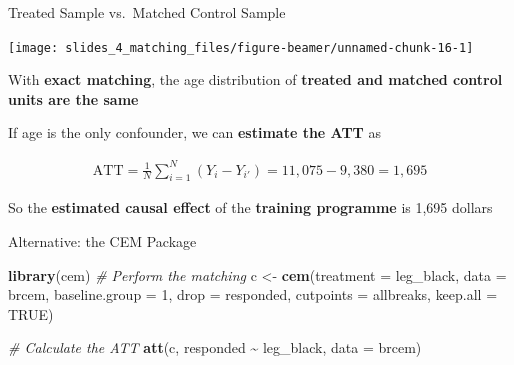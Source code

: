 \documentclass[
  ignorenonframetext,
  aspectratio=169, handout]{beamer}
\newenvironment{Shaded}{\begin{snugshade}}{\end{snugshade}}
\newcommand{\AttributeTok}[1]{\textcolor[rgb]{0.13,0.29,0.53}{#1}}
\newcommand{\CommentTok}[1]{\textcolor[rgb]{0.56,0.35,0.01}{\textit{#1}}}
\newcommand{\ConstantTok}[1]{\textcolor[rgb]{0.56,0.35,0.01}{#1}}
\newcommand{\FunctionTok}[1]{\textcolor[rgb]{0.13,0.29,0.53}{\textbf{#1}}}
\newcommand{\NormalTok}[1]{#1}
\newcommand{\OtherTok}[1]{\textcolor[rgb]{0.56,0.35,0.01}{#1}}
\newcommand{\SpecialCharTok}[1]{\textcolor[rgb]{0.81,0.36,0.00}{\textbf{#1}}}
\newcommand{\StringTok}[1]{\textcolor[rgb]{0.31,0.60,0.02}{#1}}
\newcommand{\brf}[1]{\textcolor{brickred}{\textbf{#1}}}
\begin{document}
\begin{frame}{Treated Sample vs.~Matched Control Sample}
\protect\hypertarget{treated-sample-vs.-matched-control-sample}{}
\begin{center}\texttt{[image: slides\_4\_matching\_files/figure-beamer/unnamed-chunk-16-1]} \end{center}

With \brf{exact matching}, the age distribution of
\brf{treated and matched control units are the same}

\vfill

If age is the only confounder, we can \brf{estimate the ATT} as

\begin{align*}
\text{ATT} = \frac{1}{N} \sum_{i=1}^N (Y_i - Y_{i'}) = 11,075 - 9,380 = 1,695
\end{align*}

So the \brf{estimated causal effect} of the \brf{training programme} is
1,695 dollars
\end{frame}

\begin{frame}[fragile]{Alternative: the CEM Package}
\protect\hypertarget{alternative-the-cem-package}{}
\footnotesize

\begin{Shaded}
\begin{Highlighting}[]
\FunctionTok{library}\NormalTok{(cem)}
\CommentTok{\# Perform the matching}
\NormalTok{c }\OtherTok{\textless{}{-}} \FunctionTok{cem}\NormalTok{(}\AttributeTok{treatment =} \StringTok{\textquotesingle{}leg\_black\textquotesingle{}}\NormalTok{, }\AttributeTok{data =}\NormalTok{ brcem,}
         \AttributeTok{baseline.group =}  \StringTok{\textquotesingle{}1\textquotesingle{}}\NormalTok{,}
         \AttributeTok{drop =} \StringTok{\textquotesingle{}responded\textquotesingle{}}\NormalTok{,}
         \AttributeTok{cutpoints =}\NormalTok{ allbreaks,}
         \AttributeTok{keep.all =} \ConstantTok{TRUE}\NormalTok{)}

\CommentTok{\# Calculate the ATT}
\FunctionTok{att}\NormalTok{(c, responded }\SpecialCharTok{\textasciitilde{}}\NormalTok{ leg\_black, }\AttributeTok{data =}\NormalTok{ brcem)}
\end{Highlighting}
\end{Shaded}
\end{frame}
\end{document}
